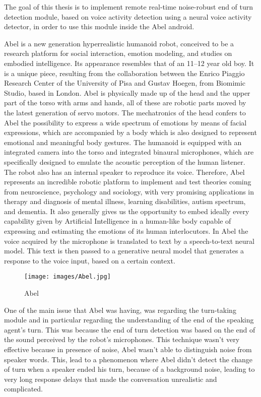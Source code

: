 \documentclass[../main.tex]{subfiles}
\begin{document}
The goal of this thesis is to implement remote real-time noise-robust end of turn detection module, based on voice activity detection using a neural voice activity detector, in order to use this module inside the Abel android. 

Abel is a new generation hyperrealistic humanoid robot, conceived to be a research platform for social interaction, emotion modeling, and studies on embodied intelligence. Its appearance resembles that of an 11–12 year old boy. It is a unique piece, resulting from the collaboration between the Enrico Piaggio Research Center of the University of Pisa and Gustav Hoegen, from Biomimic Studio, based in London. Abel is physically made up of the head and the upper part of the torso with arms and hands, all of these are robotic parts moved by the latest generation of servo motors. The mechatronics of the head confers to Abel the possibility to express a wide spectrum of emotions by means of facial expressions, which are accompanied by a body which is also designed to represent emotional and meaningful body gestures.
The humanoid is equipped with an integrated camera into the torso and integrated binaural microphones, which are specifically designed to emulate the acoustic perception of the human listener. The robot also has an internal speaker to reproduce its voice. Therefore, Abel represents an incredible robotic platform to implement and test theories coming
from neuroscience, psychology and sociology, with very promising applications in therapy and
diagnosis of mental illness, learning disabilities, autism spectrum, and dementia.
It also generally gives us the opportunity to embed ideally every capability given by Artificial
Intelligence in a human-like body capable of expressing and estimating the emotions of its human
interlocutors. In Abel the voice acquired by the microphone is translated to text by a speech-to-text neural model. This text is then passed to a generative neural model that generates a response to the voice input, based on a certain context.  

\begin{figure}[ht]
    \centering
    \texttt{[image: images/Abel.jpg]}
    \caption{Abel}
    \label{fig:abel}
\end{figure}

One of the main issue that Abel was having, was regarding the turn-taking module and in particular regarding the understanding of the end of the speaking agent's turn. This was because the end of turn detection was based on the end of the sound perceived by the robot's microphones. This technique wasn't very effective because in presence of noise, Abel wasn't able to distinguish noise from speaker words. This, lead to a phenomenon where Abel didn't detect the change of turn when a speaker ended his turn, because of a background noise, leading to very long response delays that made the conversation unrealistic and complicated. 
\end{document}
